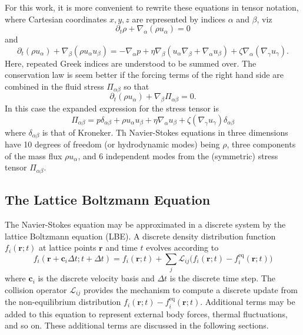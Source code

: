 For this work, it is more convenient to rewrite these equations
in tensor notation, where Cartesian coordinates ${x,y,z}$ are
represented by indices $\alpha$ and $\beta$, viz
\begin{equation}
\partial_t \rho + \nabla_\alpha (\rho u_\alpha) = 0
\end{equation}
and
\begin{equation}
\partial_t (\rho u_\alpha) + \nabla_\beta (\rho u_\alpha u_\beta)
= -\nabla_\alpha p
+  \eta \nabla_\beta (u_\alpha \nabla_\beta + \nabla_\alpha u_\beta)
+ \zeta \nabla_\alpha (\nabla_\gamma u_\gamma).
\end{equation}
Here, repeated Greek indices are understood to be summed over.
The conservation law is seem better if the forcing terms of the
right hand side are combined in the fluid stress $\Pi_{\alpha\beta}$
so that
\begin{equation}
\partial_t (\rho u_\alpha) +\nabla_\beta \Pi_{\alpha\beta} = 0.
\end{equation}
In this case the expanded expression for the stress tensor is
\begin{equation}
\Pi_{\alpha\beta} = p \delta_{\alpha\beta} + \rho u_\alpha u_\beta 
+ \eta \nabla_\alpha u_\beta + \zeta (\nabla_\gamma u_\gamma)\delta_{\alpha\beta}
\end{equation}
where $\delta_{\alpha\beta}$ is that of Kroneker. Th Navier-Stokes
equations in three dimensions have 10 degrees of freedom
(or hydrodynamic modes) being
$\rho$, three components of the mass flux $\rho u_\alpha$, and 6 independent
modes from the (symmetric) stress tensor $\Pi_{\alpha\beta}$.

\subsection{The Lattice Boltzmann Equation}

The Navier-Stokes equation may be approximated in a discrete system
by the lattice Boltzmann equation (LBE). A discrete density
distribution function $f_i(\mathbf{r}; t)$ at lattice points $\mathbf{r}$
and time $t$ evolves according to
\begin{equation}
f_i (\mathbf{r} + \mathbf{c}_i \Delta t; t + \Delta t) =
f_i (\mathbf{r}; t) + \sum_j \mathcal{L}_{ij}
\big( f_i(\mathbf{r};t) - f_i^{\mathrm{eq}}(\mathbf{r};t) \big)
\end{equation}
where $\mathbf{c}_i$ is the discrete velocity basis and $\Delta t$
is the discrete time step. The collision operator
$\mathcal{L}_{ij}$ provides the mechanism to compute a discrete
update from the non-equilibrium distribution
$f_i(\mathbf{r}; t)- f_i^\mathrm{eq}(\mathbf{r};t)$. Additional terms
may be added to this equation to represent external body forces,
thermal fluctuations, and so on. These additional terms are discussed
in the following sections.

